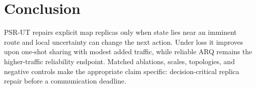 \documentclass[conference]{IEEEtran}
\begin{document}
\section{Conclusion}
PSR-UT repairs explicit map replicas only when state lies near an imminent
route and local uncertainty can change the next action. Under loss it improves
upon one-shot sharing with modest added traffic, while reliable ARQ remains the
higher-traffic reliability endpoint. Matched ablations, scales, topologies, and
negative controls make the appropriate claim specific: decision-critical
replica repair before a communication deadline.



\end{document}
